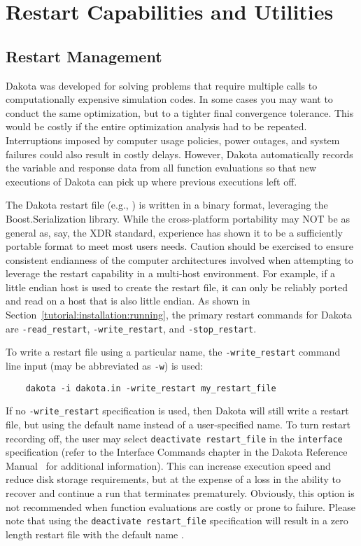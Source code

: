 \chapter{Restart Capabilities and Utilities}\label{restart}

\section{Restart Management}\label{restart:management}

Dakota was developed for solving problems that require multiple calls
to computationally expensive simulation codes. In some cases you may
want to conduct the same optimization, but to a tighter final
convergence tolerance. This would be costly if the entire optimization
analysis had to be repeated. Interruptions imposed by computer usage
policies, power outages, and system failures could also result in
costly delays. However, Dakota automatically records the variable and
response data from all function evaluations so that new executions of
Dakota can pick up where previous executions left off.

The Dakota restart file (e.g., ) is written in a
binary format, leveraging the Boost.Serialization library. While the
cross-platform portability may NOT be as general as, say, the XDR standard,
experience has shown it to be a sufficiently portable format to meet
most users needs.  Caution should be exercised to ensure consistent
endianness of the computer architectures involved when attempting to leverage
the restart capability in a multi-host environment.  For example, if a little
endian host is used to create the restart file, it can only be reliably ported
and read on a host that is also little endian.  As shown in
Section~\ref{tutorial:installation:running},
the primary restart commands for Dakota are
\texttt{-read\_restart}, \texttt{-write\_restart}, and \texttt{-stop\_restart}.

To write a restart file using a particular name, the
\texttt{-write\_restart} command line input (may be abbreviated as
\texttt{-w}) is used:
\begin{small}
\begin{verbatim}
    dakota -i dakota.in -write_restart my_restart_file
\end{verbatim}
\end{small}
If no \texttt{-write\_restart} specification is used, then Dakota will
still write a restart file, but using the default name
 instead of a user-specified name.  To turn restart
recording off, the user may select \texttt{deactivate restart\_file}
in the \texttt{interface} specification (refer to the Interface
Commands chapter in the Dakota Reference Manual~\cite{RefMan} for
additional information).  This can increase execution speed and reduce
disk storage requirements, but at the expense of a loss in the ability
to recover and continue a run that terminates prematurely.  Obviously,
this option is not recommended when function evaluations are costly or
prone to failure. Please note that using the \texttt{deactivate restart\_file}
specification will result in a zero length restart file
with the default name .

